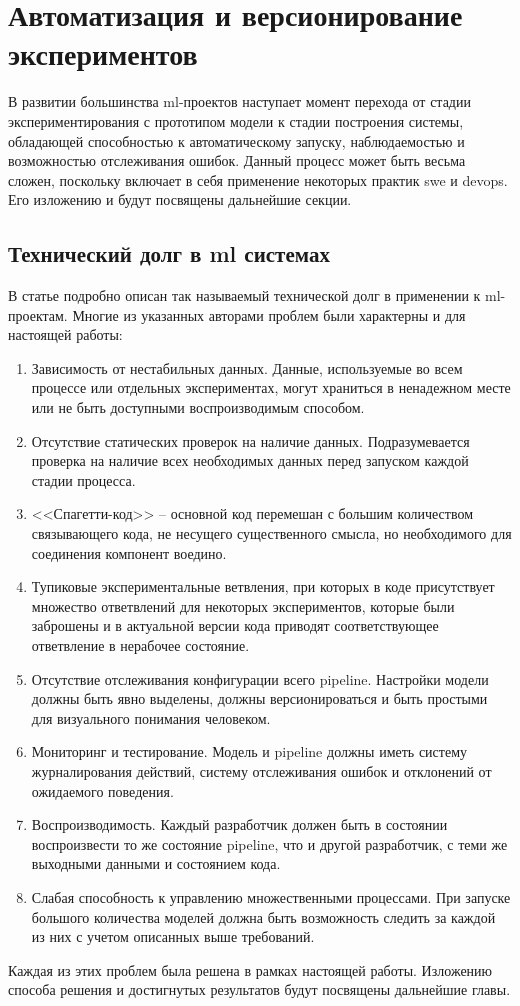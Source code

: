 
\chapter{Автоматизация и версионирование экспериментов}
В развитии большинства \acrshort{ml}-проектов наступает момент перехода от стадии экспериментирования с прототипом модели к стадии построения системы, обладающей способностью к автоматическому запуску, наблюдаемостью и возможностью отслеживания ошибок. 
Данный процесс может быть весьма сложен, поскольку включает в себя применение некоторых практик \gls{swe} и \gls{devops}.
Его изложению и будут посвящены дальнейшие секции.
\section{Технический долг в \acrshort{ml} системах}
\label{sec:ml-debt}
В статье \cite{cite:ml-debt} подробно описан так называемый технической долг в применении к \acrshort{ml}-проектам.
Многие из указанных авторами проблем были характерны и для настоящей работы:
\begin{enumerate}
    \item Зависимость от нестабильных данных.
        Данные, используемые во всем процессе или отдельных экспериментах, могут храниться в ненадежном месте или не быть доступными воспроизводимым способом.
    \item Отсутствие статических проверок на наличие данных.
        Подразумевается проверка на наличие всех необходимых данных перед запуском каждой стадии процесса.
    \item <<Спагетти-код>> -- основной код перемешан с большим количеством связывающего кода, не несущего существенного смысла, но необходимого для соединения компонент воедино.
    \item Тупиковые экспериментальные ветвления, при которых в коде присутствует множество ответвлений для некоторых экспериментов, которые были заброшены и в актуальной версии кода приводят соответствующее ответвление в нерабочее состояние.
    \item Отсутствие отслеживания конфигурации всего \gls{pipeline}.
    Настройки модели должны быть явно выделены, должны версионироваться и быть простыми для визуального понимания человеком.
    \item Мониторинг и тестирование.
        Модель и \gls{pipeline} должны иметь систему журналирования действий, систему отслеживания ошибок и отклонений от ожидаемого поведения.
    \item Воспроизводимость.
        Каждый разработчик должен быть в состоянии воспроизвести то же состояние \gls{pipeline}, что и другой разработчик, с теми же выходными данными и состоянием кода.
    \item Слабая способность к управлению множественными процессами.
        При запуске большого количества моделей должна быть возможность следить за каждой из них с учетом описанных выше требований.
\end{enumerate}
Каждая из этих проблем была решена в рамках настоящей работы.
Изложению способа решения и достигнутых результатов будут посвящены дальнейшие главы.
